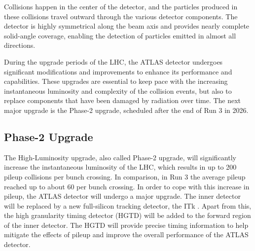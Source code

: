 Collisions happen in the center of the detector, and the particles produced in these collisions travel outward through the various detector components. The detector is highly symmetrical along the beam axis and provides nearly complete solid-angle coverage, enabling the detection of particles emitted in almost all directions.

During the upgrade periods of the LHC, the ATLAS detector undergoes significant modifications and improvements to enhance its performance and capabilities. These upgrades are essential to keep pace with the increasing instantaneous luminosity and complexity of the collision events, but also to replace components that have been damaged by radiation over time. The next major upgrade is the Phase-2 upgrade, scheduled after the end of Run 3 in 2026.

\subsection{Phase-2 Upgrade}

The High-Luminosity upgrade, also called Phase-2 upgrade, will significantly increase the instantaneous luminosity of the LHC, which results in up to 200 pileup collisions per bunch crossing. In comparison, in Run 3 the average pileup reached up to about 60 per bunch crossing. In order to cope with this increase in pileup, the ATLAS detector will undergo a major upgrade. The inner detector will be replaced by a new full-silicon tracking detector, the ITk \cite{itk-pixel-tdr}\cite{itk-strip-tdr}. Apart from this, the high granularity timing detector (HGTD) \cite{hgtd-tdr} will be added to the forward region of the inner detector. The HGTD will provide precise timing information to help mitigate the effects of pileup and improve the overall performance of the ATLAS detector.
